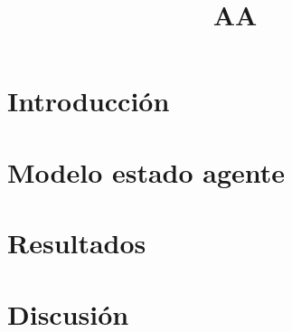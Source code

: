\documentclass[hidelinks,a4paper,12pt, nofootinbib]{article}
\title{AA}
\begin{document}
\maketitle

\tableofcontents
\newpage

\section{Introducción}


\section{Modelo estado agente}


\section{Resultados}



\section{Discusión}



\newpage
\printbibliography

\end{document}

